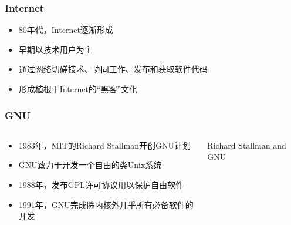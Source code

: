 \documentclass[xcolor=svgnames,bigger,presentation]{beamer}
\begin{document}
\begin{frame}
\frametitle{Internet}
\label{sec-2-2-2}
\begin{itemize}

\item 80年代，Internet逐渐形成
\label{sec-2-2-2-1}%

\item 早期以技术用户为主
\label{sec-2-2-2-2}%

\item 通过网络切磋技术、协同工作、发布和获取软件代码
\label{sec-2-2-2-3}%

\item 形成植根于Internet的“黑客”文化
\label{sec-2-2-2-4}%
\end{itemize} %
\end{frame}
\begin{frame}
\frametitle{GNU}
\label{sec-2-2-3}
\begin{columns}
\begin{column}{0.5\textwidth}
\label{sec-2-2-3-1}
\begin{itemize}

\item 1983年，MIT的Richard Stallman开创GNU计划
\label{sec-2-2-3-2}%

\item GNU致力于开发一个自由的类Unix系统
\label{sec-2-2-3-3}%

\item 1988年，发布GPL许可协议用以保护自由软件
\label{sec-2-2-3-4}%

\item 1991年，GNU完成除内核外几乎所有必备软件的开发
\label{sec-2-2-3-5}%
\end{itemize} %
\end{column}
\begin{column}{0.5\textwidth}
\begin{exampleblock}{Richard Stallman and GNU}
\label{sec-2-2-3-6}


\end{exampleblock}
\end{column}
\end{columns}
\end{frame}
\end{document}
